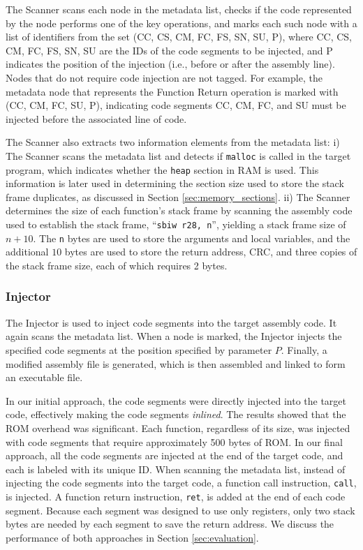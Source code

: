 The Scanner scans each node in the metadata list, checks if the code represented by the node performs one of the key operations, and marks each such node with a list of identifiers from the set (CC, CS, CM, FC, FS, SN, SU, P), where CC, CS, CM, FC, FS, SN, SU are the IDs of the code segments to be injected, and P indicates the position of the injection (i.e., before or after the assembly line). Nodes that do not require code injection are not tagged. For example, the metadata node that represents the Function Return operation is marked with (CC, CM, FC, SU, P), indicating code segments CC, CM, FC, and SU must be injected before the associated line of code.

The Scanner also extracts two information elements from the metadata list: i) The Scanner scans the metadata list and detects if \texttt{malloc} is called in the target program, which indicates whether the \texttt{heap} section in RAM is used. This information is later used in determining the section size used to store the stack frame duplicates, as discussed in Section \ref{sec:memory_sections}. ii) The Scanner determines the size of each function's stack frame by scanning the assembly code used to establish the stack frame, ``\texttt{sbiw r28, n}'', yielding a stack frame size of $n + 10$. The \texttt{n} bytes are used to store the arguments and local variables, and the additional $10$ bytes are used to store the return address, CRC, and three copies of the stack frame size, each of which requires 2 bytes.
\vspace{-15pt}
\subsubsection{Injector}

The Injector is used to inject code segments into the target assembly code. It again scans the metadata list. When a node is marked, the Injector injects the specified code segments at the position specified by parameter $P$. Finally, a modified assembly file is generated, which is then assembled and linked to form an executable file.

In our initial approach, the code segments were directly injected into the target code, effectively making the code segments \textit{inlined}. The results showed that the ROM overhead was significant. Each function, regardless of its size, was injected with code segments that require approximately 500 bytes of ROM. In our final approach, all the code segments are injected at the end of the target code, and each is labeled with its unique ID. When scanning the metadata list, instead of injecting the code segments into the target code, a function call instruction, \texttt{call}, is injected. A function return instruction, \texttt{ret}, is added at the end of each code segment. Because each segment was designed to use only registers, only two stack bytes are needed by each segment to save the return address. We discuss the performance of both approaches in Section \ref{sec:evaluation}.
\vspace{-15pt}
